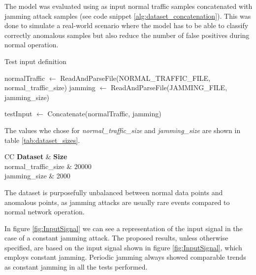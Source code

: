 \documentclass[futureinternet,article,submit,pdftex,moreauthors]{Definitions/mdpi}
\begin{document}
The model was evaluated using as input normal traffic samples concatenated with jamming attack samples (see code snippet \ref{alg:dataset_concatenation}). 
This was done to simulate a real-world scenario where the model has to be able to classify correctly anomalous samples but also reduce the number of false positives during normal operation. 

\begin{algorithm}
	\caption{Test input definition}\label{alg:dataset_concatenation}
	\begin{algorithmic}[1]
	\State normalTraffic $\gets$ ReadAndParseFile(NORMAL\_TRAFFIC\_FILE, normal\_traffic\_size)
	\State jamming $\gets$ ReadAndParseFile(JAMMING\_FILE, jamming\_size)

	\State testInput $\gets$ Concatenate(normalTraffic, jamming)
	\end{algorithmic}
\end{algorithm}

The values whe chose for \textit{normal\_traffic\_size} and \textit{jamming\_size} are shown in table \ref{tab:dataset_sizes}. 

\begin{table}[H]
	\caption{Dataset sizes used for the tuning and testing phases.}\label{tab:dataset_sizes}
	\begin{tabularx}{\textwidth}{CC}
	\toprule
	\textbf{Dataset} & \textbf{Size} \\
	\midrule
	normal\_traffic\_size & 20000 \\
	jamming\_size & 2000 \\
	\bottomrule
\end{tabularx}
\end{table}

The dataset is purposefully unbalanced between normal data points and anomalous points, as jamming attacks are usually rare events compared to normal network operation. 

In figure \ref{fig:InputSignal} we can see a representation of the input signal in the case of a constant jamming attack. The proposed results, unless otherwise specified, are based on the input signal shown in figure \ref{fig:InputSignal}, which employs constant jamming. Periodic jamming always showed comparable trends as constant jamming in all the tests performed.
\end{document}
